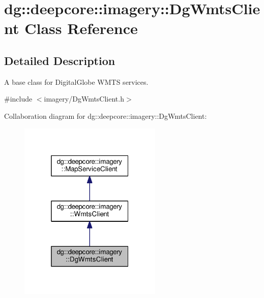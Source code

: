 \hypertarget{classdg_1_1deepcore_1_1imagery_1_1_dg_wmts_client}{}\section{dg\+:\+:deepcore\+:\+:imagery\+:\+:Dg\+Wmts\+Client Class Reference}
\label{classdg_1_1deepcore_1_1imagery_1_1_dg_wmts_client}


\subsection{Detailed Description}
A base class for Digital\+Globe W\+M\+TS services. 

{\ttfamily \#include $<$imagery/\+Dg\+Wmts\+Client.\+h$>$}



Collaboration diagram for dg\+:\+:deepcore\+:\+:imagery\+:\+:Dg\+Wmts\+Client\+:
\nopagebreak
\begin{figure}[H]
\begin{center}
\leavevmode
\includegraphics[width=193pt]{classdg_1_1deepcore_1_1imagery_1_1_dg_wmts_client__coll__graph}
\end{center}
\end{figure}
